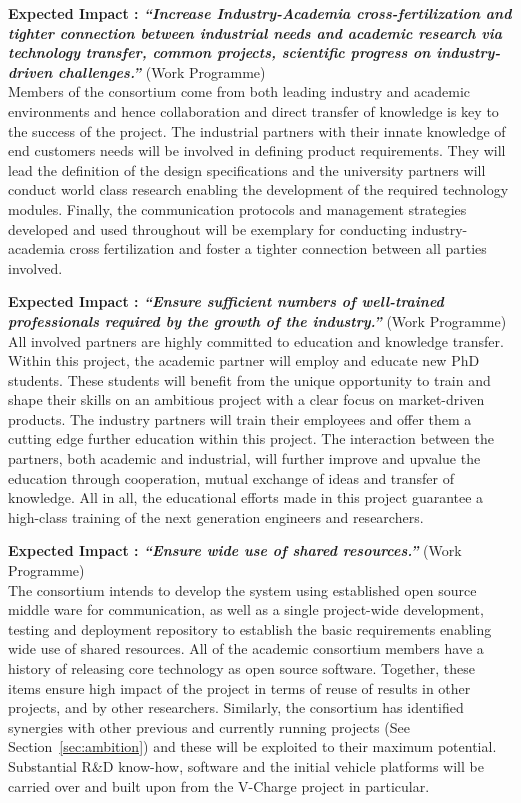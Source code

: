 \textbf{Expected Impact  : \textit{``Increase Industry-Academia cross-fertilization and tighter connection between industrial needs and academic research via technology transfer, common projects, scientific progress on industry-driven challenges.''}} (Work Programme)\\
Members of the \Project{} consortium come from both leading industry and academic environments and hence collaboration and direct transfer of knowledge is key to the success of the project. The industrial partners with their innate knowledge of end customers needs will be involved in defining product requirements. They will lead the definition of the design specifications and the university partners will conduct world class research enabling the development of the required technology modules. Finally, the communication protocols and management strategies developed and used throughout \Project{} will be exemplary for conducting industry-academia cross fertilization and foster a tighter connection between all parties involved.


\textbf{Expected Impact  : \textit{``Ensure sufficient numbers of well-trained professionals required by the growth of the industry.''}} (Work Programme) \\
All involved partners are highly committed to education and knowledge transfer. Within this project, the academic partner will employ and educate new PhD students. These students will benefit from the unique opportunity to train and shape their skills on an ambitious project with a clear focus on market-driven products. The industry partners will train their employees and offer them a cutting edge further education within this project. The interaction between the partners, both academic and industrial, will further improve and upvalue the education through cooperation, mutual exchange of ideas and transfer of knowledge. All in all, the educational efforts made in this project guarantee a high-class training of the next generation engineers and researchers.


\textbf{Expected Impact  : \textit{``Ensure wide use of shared resources.''}} 
(Work Programme) \\
The consortium intends to develop the system using established open source middle ware for communication, as well as a single project-wide development, testing and deployment repository to establish the basic requirements enabling wide use of shared resources. All of the academic consortium members have a history of releasing core technology as open source software. Together, these items ensure high impact of the project in terms of reuse of results in other projects, and by other researchers. Similarly, the consortium has identified synergies with other previous and currently running projects (See Section~\ref{sec:ambition}) and these will be exploited to their maximum potential. Substantial R\&D know-how, software and the initial vehicle platforms will be carried over and built upon from the V-Charge project in particular.




